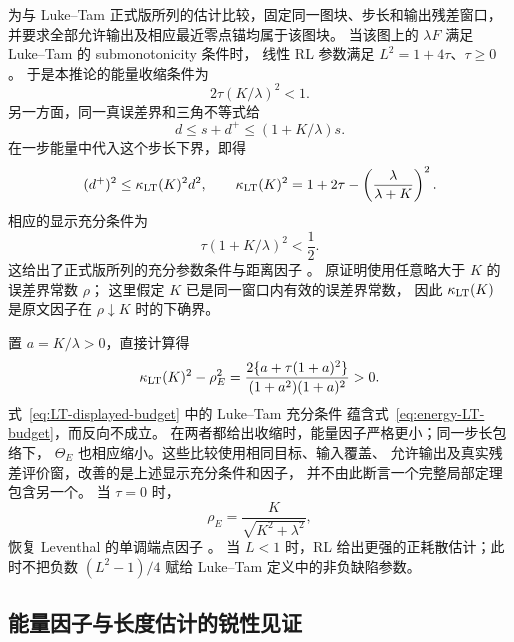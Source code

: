 为与 Luke--Tam 正式版所列的估计比较，固定同一图块、步长和输出残差窗口，
并要求全部允许输出及相应最近零点锚均属于该图块。
当该图上的 $\lambda F$ 满足 Luke--Tam 的 submonotonicity 条件时，
线性 RL 参数满足 $L^2=1+4\tau$、$\tau\ge0$
\cite[Definition~2]{LukeTam2025GeneralizedMonotonicity}。
于是本推论的能量收缩条件为
\begin{equation}
\label{eq:energy-LT-budget}
 2\tau(K/\lambda)^2<1.
\end{equation}
另一方面，同一真误差界和三角不等式给
\[
 d\le s+d^+\le(1+K/\lambda)s.
\]
在一步能量中代入这个步长下界，即得
\begin{equation}
\label{eq:LT-displayed-factor}
 (d^+)^2\le\kappa_{\rm LT}(K)^2d^2,
 \qquad
 \kappa_{\rm LT}(K)^2
 =1+2\tau-\left(\frac{\lambda}{\lambda+K}\right)^2.
\end{equation}
相应的显示充分条件为
\begin{equation}
\label{eq:LT-displayed-budget}
 \tau(1+K/\lambda)^2<\frac12.
\end{equation}
这给出了正式版所列的充分参数条件与距离因子
\cite[Assumption~2, Theorem~2]{LukeTam2025GeneralizedMonotonicity}。
原证明使用任意略大于 $K$ 的误差界常数 $\rho$；
这里假定 $K$ 已是同一窗口内有效的误差界常数，
因此 $\kappa_{\rm LT}(K)$ 是原文因子在 $\rho\downarrow K$ 时的下确界。

置 $a=K/\lambda>0$，直接计算得
\begin{equation}
\label{eq:LT-energy-factor-gap}
 \kappa_{\rm LT}(K)^2-\rho_E^2
 =\frac{2\{a+\tau(1+a)^2\}}{(1+a^2)(1+a)^2}>0.
\end{equation}
式~\eqref{eq:LT-displayed-budget} 中的 Luke--Tam 充分条件
蕴含式~\eqref{eq:energy-LT-budget}，而反向不成立。
在两者都给出收缩时，能量因子严格更小；同一步长包络下，
$\Theta_E$ 也相应缩小。这些比较使用相同目标、输入覆盖、
允许输出及真实残差评价窗，改善的是上述显示充分条件和因子，
并不由此断言一个完整局部定理包含另一个。
当 $\tau=0$ 时，
\[
 \rho_E=\frac{K}{\sqrt{K^2+\lambda^2}},
\]
恢复 Leventhal 的单调端点因子
\cite[Theorem~3.1]{Leventhal2009MetricSubregularityPPA}。
当 $L<1$ 时，RL 给出更强的正耗散估计；此时不把负数
$(L^2-1)/4$ 赋给 Luke--Tam 定义中的非负缺陷参数。

\subsection{能量因子与长度估计的锐性见证}

